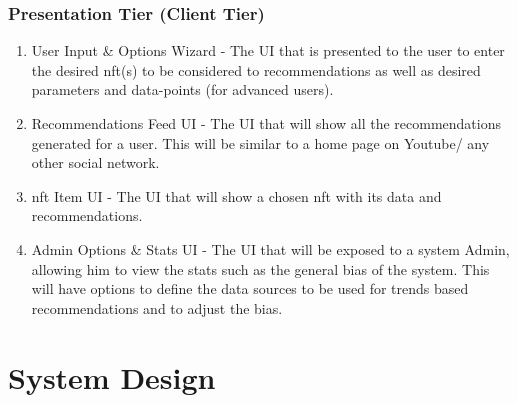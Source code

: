 \subsubsection{Presentation Tier (Client Tier)}
\begin{enumerate}
    \item User Input \& Options Wizard - The UI that is presented to the user to enter the desired \gls{nft}(s) to be considered to recommendations as well as desired parameters and data-points (for advanced users).
    \item Recommendations Feed UI - The UI that will show all the recommendations generated for a user. This will be similar to a home page on Youtube/ any other social network.
    \item \gls{nft} Item UI - The UI that will show a chosen \gls{nft} with its data and recommendations.
    \item Admin Options \& Stats UI - The UI that will be exposed to a system Admin, allowing him to view the stats such as the general bias of the system. This will have options to define the data sources to be used for trends based recommendations and to adjust the bias.
\end{enumerate}





\section{System Design}
